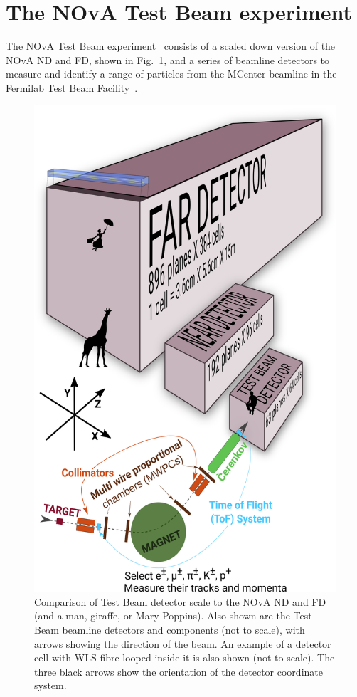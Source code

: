 \section{The NOvA Test Beam experiment}\label{sec:TBExperiment}

The \gls{NOvA} Test Beam experiment~\cite{NOvA-doc-22172} consists of a scaled down version of the \gls{NOvA} \gls{ND} and \gls{FD}, shown in Fig.~\ref{fig:TBDetector}, and a series of beamline detectors to measure and identify a range of particles from the MCenter beamline in the Fermilab Test Beam Facility~\cite{FTBFWebsite}.

\begin{figure}[!ht]
\centering
\includegraphics[width=.7\textwidth]{Plots/TBCalibration/TestBeamDetectorWithArrows.png}
\caption[Comparison of Test Beam detector to the Near and Far Detectors]{Comparison of Test Beam detector scale to the \acrshort{NOvA} \acrshort{ND} and \acrshort{FD} (and a man, giraffe, or Mary Poppins). Also shown are the Test Beam beamline detectors and components (not to scale), with arrows showing the direction of the beam. An example of a detector cell with \acrshort{WLS} fibre looped inside it is also shown (not to scale). The three black arrows show the orientation of the detector coordinate system.}
\label{fig:TBDetector}
\end{figure}

